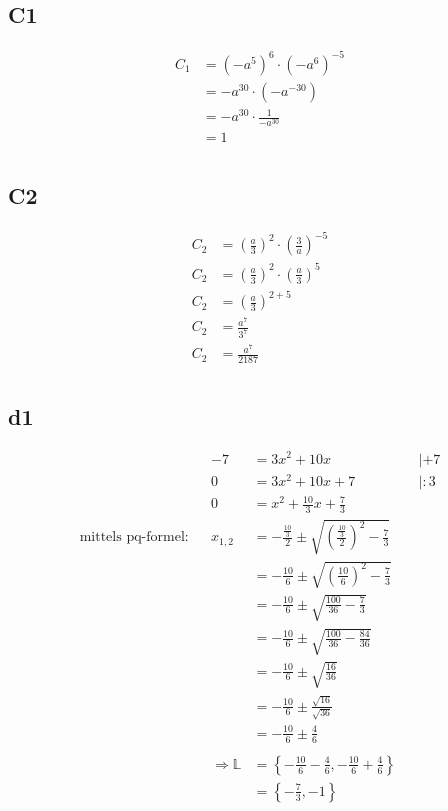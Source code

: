 \documentclass[]{article}
\newcommand{\rarr}{\Rightarrow}
\begin{document}
\subsection*{C1}
\begin{align*}
	&& C_1 &= (-a^5)^6 \cdot (-a^6)^{-5}&&\\
	&& &= -a^{30} \cdot (-a^{-30})&&\\
	&& &= -a^{30} \cdot \frac{1}{-a^{30}}&&\\
	&& &= 1 &&\\
\end{align*}
\subsection*{C2}
\begin{align*}
	&& C_2 &= (\frac{a}{3})^2 \cdot (\frac{3}{a})^{-5}&&\\
	&& C_2 &= (\frac{a}{3})^2 \cdot (\frac{a}{3})^{5}&&\\
	&& C_2 &= (\frac{a}{3})^{2+5}&&\\
	&& C_2 &= \frac{a^7}{3^7}&&\\
	&& C_2 &= \frac{a^7}{2187}&&\\
\end{align*}

\subsection*{d1}
\begin{align*}
	&& -7 &= 3x^2+10x &&| +7\\
	&& 0 &= 3x^2+10x +7 && | :3\\
	&& 0 &= x^2+\frac{10}{3}x +\frac{7}{3} &&\\
	\text{mittels pq-formel:}&& x_{1,2} &= -\frac{\frac{10}{3}}{2} \pm \sqrt{\left(\frac{\frac{10}{3}}{2}\right)^2 - \frac{7}{3}} &&\\
	&& &= -\frac{10}{6} \pm \sqrt{\left(\frac{10}{6}\right)^2 - \frac{7}{3}} &&\\
	&& &= -\frac{10}{6} \pm \sqrt{\frac{100}{36} - \frac{7}{3}} &&\\
	&& &= -\frac{10}{6} \pm \sqrt{\frac{100}{36} - \frac{84}{36}} &&\\
	&& &= -\frac{10}{6} \pm \sqrt{\frac{16}{36}} &&\\
	&& &= -\frac{10}{6} \pm \frac{\sqrt{16}}{\sqrt{36}} &&\\
	&& &= -\frac{10}{6} \pm \frac{4}{6} &&\\
	\\
	&& \rarr \mathbb{L} &= \left\{-\frac{10}{6} - \frac{4}{6}, -\frac{10}{6} + \frac{4}{6}\right\} &&\\
	&& &= \left\{-\frac{7}{3}, -1\right\} &&\\
\end{align*}
\end{document}
